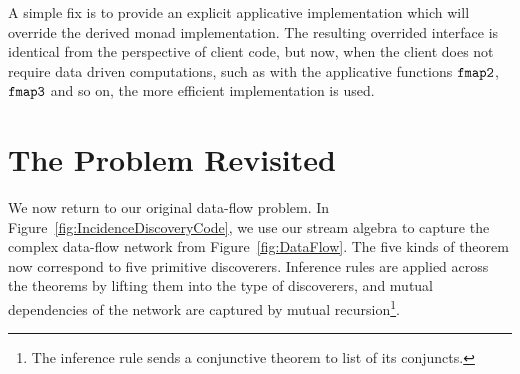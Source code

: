 A simple fix is to provide an explicit applicative implementation which will override the derived monad implementation. The resulting overrided interface is identical from the perspective of client code, but now, when the client does not require data driven computations, such as with the applicative functions $\texttt{fmap2}$, $\texttt{fmap3}$ and so on, the more efficient implementation is used.

\section{The Problem Revisited}\label{sec:Solution}
We now return to our original data-flow problem. In Figure~\ref{fig:IncidenceDiscoveryCode}, we use our stream algebra to capture the complex data-flow network from Figure~\ref{fig:DataFlow}. The five kinds of theorem now correspond to five primitive discoverers. Inference rules are applied across the theorems by lifting them into the type of discoverers, and mutual dependencies of the network are captured by mutual recursion\footnote{The inference rule  sends a conjunctive theorem to list of its conjuncts.}.

